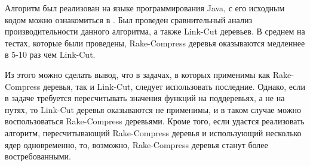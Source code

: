 Алгоритм был реализован на языке программирования Java, с его исходным кодом можно ознакомиться в \cite{github}.
Был проведен сравнительный анализ производительности данного алгоритма, а также Link-Cut деревьев. 
В среднем на тестах, которые были проведены, Rake-Compress деревья оказываются медленнее в 5-10 раз чем Link-Cut.

Из этого можно сделать вывод, что в задачах, в которых применимы как Rake-Compress деревья, так и Link-Cut, следует использовать последние.
Однако, если в задаче требуется пересчитывать значения функций на поддеревьях, 
а не на путях, то Link-Cut деревья оказываются не применимы, и в таком случае можно воспользоваться Rake-Compress деревьями.
Кроме того, если удастся реализовать алгоритм, пересчитывающий Rake-Compress деревья и использующий несколько ядер одновременно, то, возможно, 
Rake-Compress деревья станут более востребованными.




